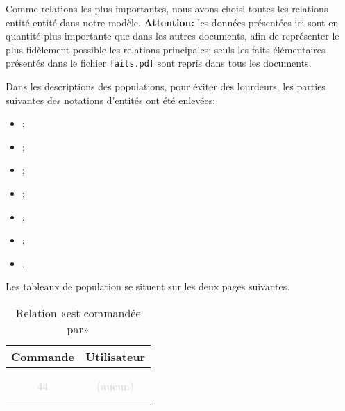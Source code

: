 \documentclass[a4paper,10pt]{article}
\begin{document}

Comme relations les plus importantes, nous avons choisi toutes les relations entité-entité dans notre modèle.
\textbf{Attention:} les données présentées ici sont en quantité plus importante que dans les autres documents, afin de représenter le plus fidèlement possible les relations principales; seuls les faits élémentaires présentés dans le fichier \texttt{faits.pdf} sont repris dans tous les documents.

Dans les descriptions des populations, pour éviter des lourdeurs, les parties suivantes des notations d'entités ont été enlevées:
\begin{itemize}
    \item {};
    \item {};
    \item {};
    \item {};
    \item {};
    \item {};
    \item {}.
\end{itemize}

Les tableaux de population se situent sur les deux pages suivantes.

\newpage

\begin{table}[h]
    \centering
    \begin{tabu}{cc}
        Commande & Utilisateur \\
        \toprule
         &  \\
         &  \\
        \textcolor{lightgray}{44} & \textcolor{lightgray}{(aucun)\footnotemark[1]} \\
         &  \\
         &  \\
    \end{tabu}
    \caption{Relation «est commandée par»}
\end{table}

\end{document}
